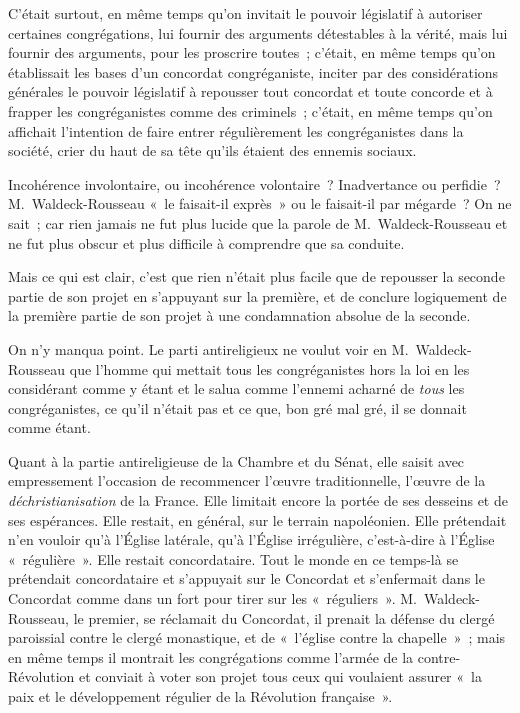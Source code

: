\documentclass[french,twoside]{book} %
\begin{document}
C’était surtout, en même temps qu’on invitait le pouvoir législatif à autoriser certaines congrégations, lui fournir des arguments détestables à la vérité, mais lui fournir des arguments, pour les proscrire toutes ; c’était, en même temps qu’on établissait les bases d’un concordat congréganiste, inciter par des considérations générales le pouvoir législatif à repousser tout concordat et toute concorde et à frapper les congréganistes comme des criminels ; c’était, en même temps qu’on affichait l’intention de faire entrer régulièrement les congréganistes dans la société, crier du haut de sa tête qu’ils étaient des ennemis sociaux.\par
 Incohérence involontaire, ou incohérence volontaire ? Inadvertance ou perfidie ? M. Waldeck-Rousseau « le faisait-il exprès » ou le faisait-il par mégarde ? On ne sait ; car rien jamais ne fut plus lucide que la parole de M. Waldeck-Rousseau et ne fut plus obscur et plus difficile à comprendre que sa conduite.\par
Mais ce qui est clair, c’est que rien n’était plus facile que de repousser la seconde partie de son projet en s’appuyant sur la première, et de conclure logiquement de la première partie de son projet à une condamnation absolue de la seconde.\par
On n’y manqua point. Le parti antireligieux ne voulut voir en M. Waldeck-Rousseau que l’homme qui mettait tous les congréganistes hors la loi en les considérant comme y étant et le salua comme l’ennemi acharné de {\itshape tous} les congréganistes, ce qu’il n’était pas et ce que, bon gré mal gré, il se donnait comme étant.\par
Quant à la partie antireligieuse de la Chambre et du Sénat, elle saisit avec empressement l’occasion de recommencer l’œuvre traditionnelle, l’œuvre de la {\itshape déchristianisation} de la France. Elle limitait encore la portée de ses desseins et de ses espérances. Elle restait, en général, sur le terrain napoléonien. Elle prétendait n’en vouloir qu’à  l’Église latérale, qu’à l’Église irrégulière, c’est-à-dire à l’Église « régulière ». Elle restait concordataire. Tout le monde en ce temps-là se prétendait concordataire et s’appuyait sur le Concordat et s’enfermait dans le Concordat comme dans un fort pour tirer sur les « réguliers ». M. Waldeck-Rousseau, le premier, se réclamait du Concordat, il prenait la défense du clergé paroissial contre le clergé monastique, et de « l’église contre la chapelle » ; mais en même temps il montrait les congrégations comme l’armée de la contre-Révolution et conviait à voter son projet tous ceux qui voulaient assurer « la paix et le développement régulier de la Révolution française ».\par
\end{document}
